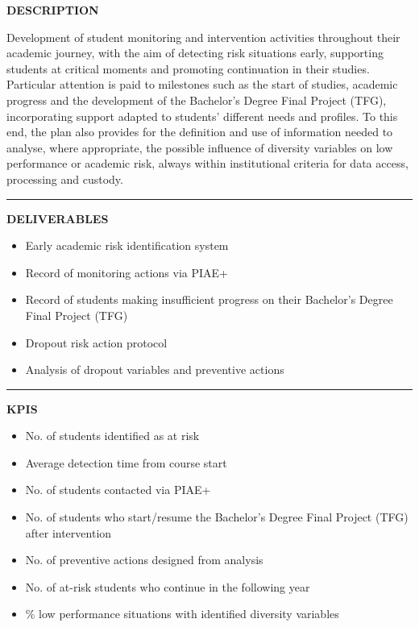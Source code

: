 \documentclass[11pt,a4paper]{scrreprt}
\newcommand{\fieldlabel}[1]{%
  {\footnotesize\sffamily\bfseries\color{mutedcolor}\MakeUppercase{#1}}\par\nopagebreak[4]
}
\newcommand{\fieldsep}{\vspace{3pt}\noindent\textcolor{bordercolor}{\rule{\linewidth}{0.4pt}}\vspace{3pt}\par}
\begin{document}
\begin{tcolorbox}[pabox={e360color}{A.P.2.2 \enspace\textbullet\enspace Monitoring and Intervention with Students Throughout Their Journey}]

\fieldlabel{Description}
{\small Development of student monitoring and intervention activities throughout their academic journey, with the aim of detecting risk situations early, supporting students at critical moments and promoting continuation in their studies. Particular attention is paid to milestones such as the start of studies, academic progress and the development of the Bachelor's Degree Final Project (TFG), incorporating support adapted to students' different needs and profiles. To this end, the plan also provides for the definition and use of information needed to analyse, where appropriate, the possible influence of diversity variables on low performance or academic risk, always within institutional criteria for data access, processing and custody. }\par
\fieldsep
\fieldlabel{Deliverables}
{\small \begin{itemize}[noitemsep,topsep=2pt]
\item Early academic risk identification system
\item Record of monitoring actions via PIAE+
\item Record of students making insufficient progress on their Bachelor's Degree Final Project (TFG)
\item Dropout risk action protocol
\item Analysis of dropout variables and preventive actions
\end{itemize}}\par
\fieldsep
\fieldlabel{KPIs}
{\small \begin{itemize}[noitemsep,topsep=2pt]
\item No. of students identified as at risk
\item Average detection time from course start
\item No. of students contacted via PIAE+
\item No. of students who start/resume the Bachelor's Degree Final Project (TFG) after intervention
\item No. of preventive actions designed from analysis
\item No. of at-risk students who continue in the following year
\item \% low performance situations with identified diversity variables
\end{itemize}}\par
\end{tcolorbox}
\end{document}
